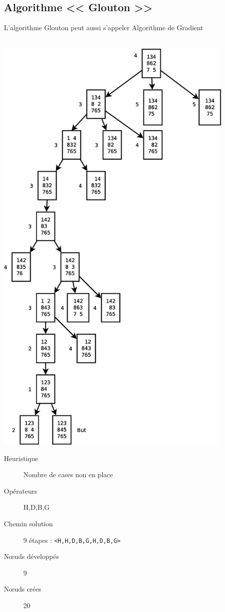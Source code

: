 \documentclass[12pt,a4paper,openany]{book}
\begin{document}
	\subsection{Algorithme << Glouton >>}
	\begin{remarque}
		L'algorithme Glouton peut aussi s'appeler Algorithme de Gradient
		\\~
	\end{remarque}
	\includegraphics[width=11.8cm]{Diagramme3.eps}	
	\begin{description}
		\item[Heuristique] Nombre de cases non en place
		\item[Opérateurs] H,D,B,G
		\item[Chemin solution] 9 étapes : \texttt{<H,H,D,B,G,H,D,B,G>}
		\item[Nœuds développés] 9
		\item[Nœuds crées] 20
	\end{description}
\end{document}
